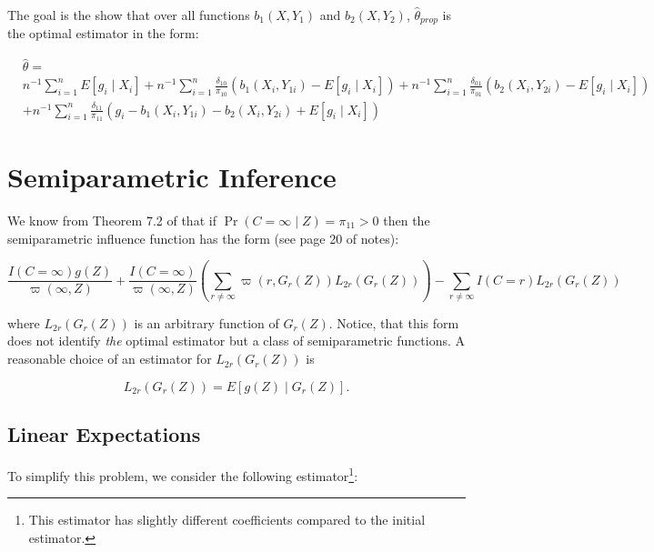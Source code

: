 \documentclass[12pt]{article}
\begin{document}
The goal is the show that over all functions $b_1(X, Y_1)$ and $b_2(X, Y_2)$,
$\hat \theta_{prop}$ is the optimal estimator in the form:

\begin{align}
  &\hat \theta =\\ \nonumber
  &n^{-1} \sum_{i = 1}^n E[g_i \mid X_i] + n^{-1} \sum_{i = 1}^n
  \frac{\delta_{10}}{\pi_{10}} (b_1(X_i, Y_{1i}) - E[g_i \mid X_i]) 
  + n^{-1} \sum_{i = 1}^n \frac{\delta_{01}}{\pi_{01}} (b_2(X_i, Y_{2i}) - E[g_i \mid X_i]) \\ \nonumber
  &+ n^{-1} \sum_{i = 1}^n \frac{\delta_{11}}{\pi_{11}} (g_i - b_1(X_i, Y_{1i}) - b_2(X_i, Y_{2i}) + E[g_i \mid X_i])
\end{align}

\section*{Semiparametric Inference}

We know from Theorem 7.2 of \cite{tsiatis2006semiparametric} that if $\Pr(C =
\infty \mid Z) = \pi_{11} > 0$ 
then the semiparametric influence function has the form (see page 20 of notes):

\begin{equation}\label{lambda2}
 \frac{I(C = \infty) g(Z)}{\varpi(\infty, Z)} + \frac{I(C =
  \infty)}{\varpi(\infty, Z)} \left(\sum_{r \neq \infty} \varpi(r, G_r(Z))
  L_{2r}(G_r(Z))\right) - \sum_{r \neq \infty} I(C = r)L_{2r}(G_r(Z))
\end{equation}

where $L_{2r}(G_r(Z))$ is an arbitrary function of $G_r(Z)$. Notice, that this
form does not identify \textit{the} optimal estimator but a class of 
semiparametric functions. A reasonable choice of an estimator for $L_{2r}(G_r(Z))$ is

\[L_{2r}(G_r(Z)) = E[g(Z) \mid G_r(Z)].\]

%
%

\subsection*{Linear Expectations}

To simplify this problem, we consider the following estimator\footnote{This
estimator has slightly different coefficients compared to the initial
estimator.}:
\end{document}
